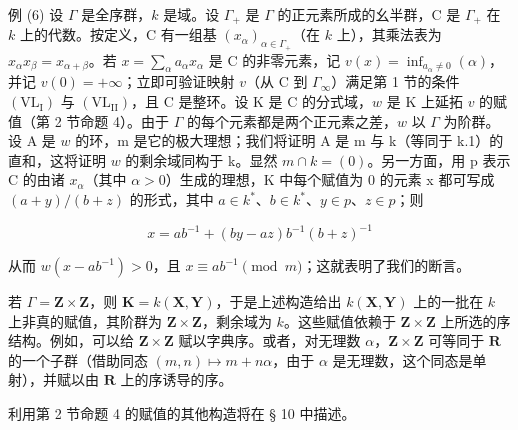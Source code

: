 例 (6) 设 \(\Gamma\) 是全序群，\(k\) 是域。设 \(\Gamma_{+}\) 是 \(\Gamma\) 的正元素所成的幺半群，C 是 \(\Gamma_{+}\) 在 \(k\) 上的代数。按定义，C 有一组基 \((x_{\alpha})_{\alpha \in \Gamma_{+}}\)（在 \(k\) 上），其乘法表为 \(x_{\alpha}x_{\beta} = x_{\alpha +\beta}\)。若 \(x = \sum_{\alpha}a_{\alpha}x_{\alpha}\) 是 C 的非零元素，记 \(v(x) = \inf_{a_{\alpha}\neq 0}(\alpha)\)，并记 \(v(0) = +\infty\)；立即可验证映射 \(v\)（从 C 到 \(\Gamma_{\infty}\)）满足第 1 节的条件 \((\mathrm{VL}_{\mathrm{I}})\) 与 \((\mathrm{VL}_{\mathrm{II}})\)，且 C 是整环。设 K 是 C 的分式域，\(w\) 是 K 上延拓 \(v\) 的赋值（第 2 节命题 4）。由于 \(\Gamma\) 的每个元素都是两个正元素之差，\(w\) 以 \(\Gamma\) 为阶群。设 A 是 \(w\) 的环，m 是它的极大理想；我们将证明 A 是 m 与 k（等同于 k.1）的直和，这将证明 \(w\) 的剩余域同构于 k。显然 \(m \cap k = (0)\)。另一方面，用 p 表示 C 的由诸 \(x_{\alpha}\)（其中 \(\alpha > 0\)）生成的理想，K 中每个赋值为 0 的元素 x 都可写成 \((a + y)/(b + z)\) 的形式，其中 \(a \in k^{*}\)、\(b \in k^{*}\)、\(y \in p\)、\(z \in p\)；则

\[
x = a b ^ {- 1} + (b y - a z) b ^ {- 1} (b + z) ^ {- 1}
\]

从而 \(w(x - ab^{-1}) > 0\)，且 \(x \equiv ab^{-1} \pmod{m}\)；这就表明了我们的断言。

若 \(\Gamma = \mathbf{Z} \times \mathbf{Z}\)，则 \(\mathbf{K} = k(\mathbf{X}, \mathbf{Y})\)，于是上述构造给出 \(k(\mathbf{X}, \mathbf{Y})\) 上的一批在 \(k\) 上非真的赋值，其阶群为 \(\mathbf{Z} \times \mathbf{Z}\)，剩余域为 \(k\)。这些赋值依赖于 \(\mathbf{Z} \times \mathbf{Z}\) 上所选的序结构。例如，可以给 \(\mathbf{Z} \times \mathbf{Z}\) 赋以字典序。或者，对无理数 \(\alpha\)，\(\mathbf{Z} \times \mathbf{Z}\) 可等同于 \(\mathbf{R}\) 的一个子群（借助同态 \((m, n) \mapsto m + n\alpha\)，由于 \(\alpha\) 是无理数，这个同态是单射），并赋以由 \(\mathbf{R}\) 上的序诱导的序。

利用第 2 节命题 4 的赋值的其他构造将在 § 10 中描述。

